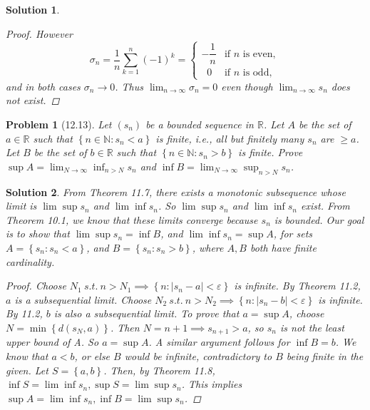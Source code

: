 \documentclass[12pt]{article}
\newtheorem{problem}{Problem}
\newtheorem{solution}{Solution}
\begin{document}
\begin{solution}
\begin{enumerate}
\begin{proof}
        However
        \[
          \sigma_n=\frac{1}{n}\sum_{k=1}^{n}(-1)^k =
          \begin{cases}
            -\dfrac1n &\text{if $n$ is even},\\[6pt]
             \;\;0    &\text{if $n$ is odd},
          \end{cases}
        \]
        and in both cases $\sigma_n\to 0$.
        Thus $\displaystyle\lim_{n\to\infty}\sigma_n = 0$
        even though $\displaystyle\lim_{n\to\infty}s_n$ does not exist.
      \end{proof}
         
    \end{enumerate}
\end{solution}

\begin{problem}[12.13]
   Let $(s_{n} )$ be a bounded sequence in $\mathbb{R}$. Let $A$ be the set of $a\in\mathbb{R} $ such that $\left\{n \in \mathbb{N} :s_{n} <a \right\} $ is finite, i.e., all but finitely many $s_{n} $ are $\geq a$. Let $B$ be the set of $b\in\mathbb{R} $ such that $\left\{ n\in \mathbb{N}: s_{n} >b \right\} $ is finite. Prove $\sup A=\lim_{N \to \infty} \inf_{n>N}s_{n} $ and $\inf B=\lim_{N \to \infty} \sup_{n>N}s_{n} $.   
\end{problem}

\begin{solution}
   From Theorem 11.7, there exists a monotonic subsequence whose limit is $\lim \sup s_{n} $  and $\lim \inf s_{n} $. So $\lim \sup s_{n} $ and $\lim \inf s_{n} $ exist. From Theorem 10.1, we know that these limits converge because $s_{n} $ is bounded. Our goal is to show that $\lim \sup s_{n}=\inf B $, and $\lim \inf s_{n} =\sup A$, for sets $A=\left\{ s_{n} :s_{n} <a \right\} $, and $B = \left\{ s_{n} :s_{n} >b \right\} $, where $A,B$ both have finite cardinality.    
\begin{proof}
    Choose $N_{1}\ s.t. \ n>N_{1}\implies \left\{  n:\left\vert s_{n} -a \right\vert < \varepsilon \right\}    $ is infinite. By Theorem 11.2, $a$ is a subsequential limit. Choose $N_{2} \ s.t. \ n>N_{2}\implies \left\{ n:\left\vert s_{n} -b \right\vert <\varepsilon   \right\}  $ is infinite. By 11.2, $b$ is also a subsequential limit. To prove that $a=\sup A$, choose $N=\mathop{\min} \left\{ d(s_{N}, a) \right\} $. Then $N=n+1\implies s_{n+1} >a$, so $s_{n} $  is not the least upper bound of A. So $a=\sup A$. A similar argument follows for $\inf B=b$. We know that $a<b$, or else $B$ would be infinite, contradictory to $B$ being finite in the given. Let $S=\left\{ a,b \right\} $. Then, by Theorem 11.8, $\inf S=\lim \inf s_{n}, \sup S=\lim \sup s_{n}  $. This implies $\sup A=\lim \inf s_{n}, \inf B=\lim \sup s_{n}  $.   
\end{proof}
\end{solution}
\end{document}

